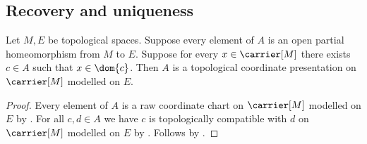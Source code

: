 \subsection{Recovery and uniqueness}

\begin{theorem}\label{open_chart_cover_is_coordinate_presentation}
    Let $M,E$ be topological spaces.
    Suppose every element of $A$ is an open partial homeomorphism from $M$ to $E$.
    Suppose for every $x\in\carrier[M]$ there exists $c\in A$ such that $x\in\dom{c}$.
    Then $A$ is a topological coordinate presentation on $\carrier[M]$
        modelled on $E$.
\end{theorem}
\begin{proof}
    Every element of $A$ is a raw coordinate chart on $\carrier[M]$
        modelled on $E$ by .
    For all $c,d\in A$ we have
        $c$ is topologically compatible with $d$ on $\carrier[M]$
            modelled on $E$ by .
    Follows by .
\end{proof}

